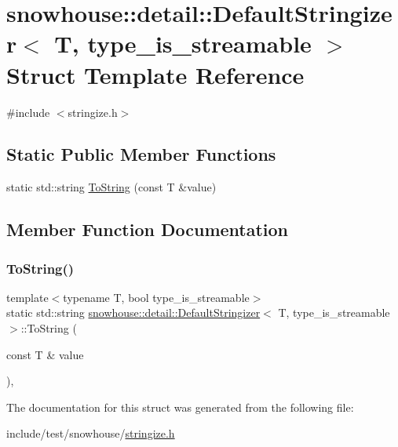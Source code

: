 \hypertarget{structsnowhouse_1_1detail_1_1DefaultStringizer}{}\section{snowhouse\+::detail\+::Default\+Stringizer$<$ T, type\+\_\+is\+\_\+streamable $>$ Struct Template Reference}
\label{structsnowhouse_1_1detail_1_1DefaultStringizer}


{\ttfamily \#include $<$stringize.\+h$>$}

\subsection*{Static Public Member Functions}
\begin{DoxyCompactItemize}
\item 
static std\+::string \mbox{\hyperlink{structsnowhouse_1_1detail_1_1DefaultStringizer_a8f2fdc8bc8affb18f0464fe1bf4a7b68}{To\+String}} (const T \&value)
\end{DoxyCompactItemize}


\subsection{Member Function Documentation}
\mbox{\label{structsnowhouse_1_1detail_1_1DefaultStringizer_a8f2fdc8bc8affb18f0464fe1bf4a7b68}} 
\subsubsection{\texorpdfstring{ToString()}{ToString()}}
{\footnotesize\ttfamily template$<$typename T, bool type\+\_\+is\+\_\+streamable$>$ \\
static std\+::string \mbox{\hyperlink{structsnowhouse_1_1detail_1_1DefaultStringizer}{snowhouse\+::detail\+::\+Default\+Stringizer}}$<$ T, type\+\_\+is\+\_\+streamable $>$\+::To\+String (\begin{DoxyParamCaption}\item[{const T \&}]{value }\end{DoxyParamCaption})\hspace{0.3cm}{\ttfamily [inline]}, {\ttfamily [static]}}



The documentation for this struct was generated from the following file\+:\begin{DoxyCompactItemize}
\item 
include/test/snowhouse/\mbox{\hyperlink{stringize_8h}{stringize.\+h}}\end{DoxyCompactItemize}
